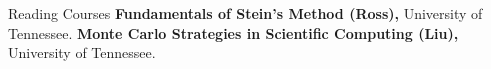 \begin{rubric}{Reading Courses}
\entry*[2026] \textbf{Fundamentals of Stein's Method (Ross),} University of Tennessee.
\entry*[2023] \textbf{Monte Carlo Strategies in Scientific Computing (Liu),} University of Tennessee.
\end{rubric}

